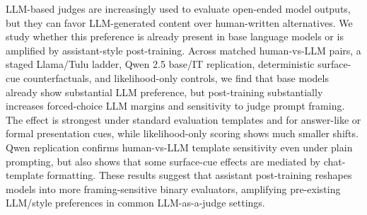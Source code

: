 \documentclass[11pt]{article}
\begin{document}
LLM-based judges are increasingly used to evaluate open-ended model outputs,
but they can favor LLM-generated content over human-written alternatives. We
study whether this preference is already present in base language models or is
amplified by assistant-style post-training. Across matched human-vs-LLM pairs,
a staged Llama/Tulu ladder, Qwen 2.5 base/IT replication, deterministic
surface-cue counterfactuals, and likelihood-only controls, we find that base
models already show substantial LLM preference, but post-training substantially
increases forced-choice LLM margins and sensitivity to judge prompt framing.
The effect is strongest under standard evaluation templates and for
answer-like or formal presentation cues, while likelihood-only scoring shows
much smaller shifts. Qwen replication confirms human-vs-LLM template
sensitivity even under plain prompting, but also shows that some surface-cue
effects are mediated by chat-template formatting. These results suggest that
assistant post-training reshapes models into more framing-sensitive binary
evaluators, amplifying pre-existing LLM/style preferences in common
LLM-as-a-judge settings.



\end{document}
